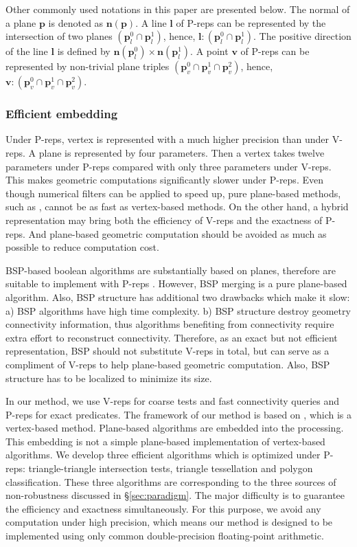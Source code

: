 Other commonly used notations in this paper are presented below. The normal of a plane $\bm{p}$ is denoted as $\bm{n}(\bm{p})$. A line $\bm{l}$ of P-reps can be represented by the intersection of two planes $(\bm{p}_l^0 \cap \bm{p}_l^1)$, hence, $\bm{l}\colon(\bm{p}_l^0 \cap \bm{p}_l^1)$. The positive direction of the line $\bm{l}$ is defined by $\bm{n}(\bm{p}_l^0) \times \bm{n}(\bm{p}_l^1)$.
A point $\bm{v}$ of P-reps can be represented by non-trivial plane triples $(\bm{p}_v^0 \cap \bm{p}_v^1 \cap \bm{p}_v^2)$, hence, $\bm{v}\colon(\bm{p}_v^0 \cap \bm{p}_v^1 \cap \bm{p}_v^2)$.

\subsubsection{Efficient embedding}

Under P-reps, vertex is represented with a much higher precision than under V-reps. A plane is represented by four parameters. Then a vertex takes twelve parameters under P-reps compared with only three parameters under V-reps. This makes geometric computations significantly slower under P-reps. Even though numerical filters can be applied to speed up, pure plane-based methods, such as \cite{sugihara1990solid,banerjee1996topologically}, cannot be as fast as vertex-based methods. On the other hand, a hybrid representation may bring both the efficiency of V-reps and the exactness of P-reps. And plane-based geometric computation should be avoided as much as possible to reduce computation cost.

BSP-based boolean algorithms are substantially based on planes, therefore are suitable to implement with P-reps \cite{bernstein2009fast,campen2010exact}. However, BSP merging is a pure plane-based algorithm. Also, BSP structure has additional two drawbacks which make it slow: a) BSP algorithms have high time complexity. b) BSP structure destroy geometry connectivity information, thus algorithms benefiting from connectivity require extra effort to reconstruct connectivity. Therefore, as an exact but not efficient representation, BSP should not substitute V-reps in total, but can serve as a compliment of V-reps to help plane-based geometric computation. Also, BSP structure has to be localized to minimize its size.

In our method, we use V-reps for coarse tests and fast connectivity queries and P-reps for exact predicates. The framework of our method is based on \cite{ogayar2015deferred}, which is a vertex-based method. Plane-based algorithms are embedded into the processing. This embedding is not a simple plane-based implementation of vertex-based algorithms. We develop three efficient algorithms which is optimized under P-reps: triangle-triangle intersection tests, triangle tessellation and polygon classification. These three algorithms are corresponding to the three sources of non-robustness discussed in \S\ref{sec:paradigm}. The major difficulty is to guarantee the efficiency and exactness simultaneously. For this purpose, we avoid any computation under high precision, which means our method is designed to be implemented using only common double-precision floating-point arithmetic.

